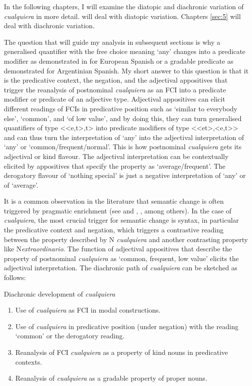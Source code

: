 {In the following chapters, I will examine the diatopic and diachronic variation of \textit{cualquiera} in more detail.  will deal with diatopic variation. Chapters \ref{sec:5} will deal with diachronic variation.

The question that will guide my analysis in subsequent sections is why a generalised quantifier with the free choice meaning ‘any’ changes into a predicate modifier as demonstrated in  for European Spanish or a gradable predicate as demonstrated for Argentinian Spanish. My short answer to this question is that it is the predicative context, the negation, and the adjectival appositives that trigger the reanalysis of postnominal \textit{cualquiera} as an FCI into a predicate modifier or predicate of an adjective type. Adjectival appositives can elicit different readings of FCIs in predicative position such as ‘similar to everybody else’, ‘common’, and ‘of low value’, and by doing this, they can turn generalised quantifiers of type <{}<e,t>,t> into predicate modifiers of type <{}<et>,<e,t>{}> and can thus turn the interpretation of ‘any’ into the adjectival interpretation of ‘any’ or ‘common/frequent/normal’. This is how postnominal \textit{cualquiera} gets its adjectival or kind flavour. The adjectival interpretation can be contextually elicited by appositives that specify the property as ‘average/frequent’. The derogatory flavour of ‘nothing special’ is just a negative interpretation of ‘any’ or of ‘average’.

It is a common observation in the literature that semantic change is often triggered by pragmatic enrichment (see  and \citealt{Traugott2002}, \citealt{Eckardt2006}, among others). In the case of \textit{cualquiera}, the most crucial trigger for semantic change is syntax, in particular the predicative context and negation, which triggers a contrastive reading between the property described by N \textit{cualquiera} and another contrasting property like N\textit{extraordinario}. The function of adjectival appositives that describe the property of postnominal \textit{cualquiera} as ‘common, frequent, low value’ elicits the adjectival interpretation. The diachronic path of \textit{cualquiera} can be sketched as follows:

\ea \label{ex:key:186} %
  Diachronic development of \textit{cualquiera}
\begin{enumerate}
\item  Use of \textit{cualquiera} as FCI in modal constructions.
\item   Use of \textit{cualquiera} in predicative position (under negation) with the reading ‘common' or the derogatory reading.
\item   Reanalysis of FCI \textit{cualquiera} as a property of kind nouns in predicative contexts.
\item  Reanalysis of \textit{cualquiera} as a gradable property of proper nouns.
\end{enumerate}
\z

}
